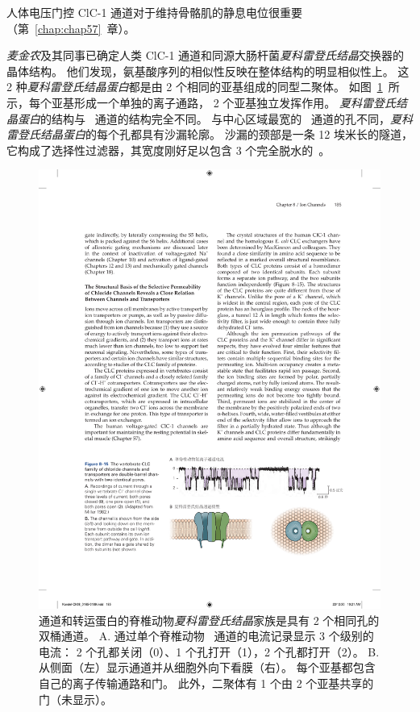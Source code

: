 人体电压门控 ClC-1 通道对于维持骨骼肌的静息电位很重要（第~\ref{chap:chap57}~章）。


\textit{麦金农}及其同事已确定人类 ClC-1 通道和同源大肠杆菌\textit{夏科雷登氏结晶}交换器的晶体结构。
他们发现，氨基酸序列的相似性反映在整体结构的明显相似性上。
这 2 种\textit{夏科雷登氏结晶蛋白}都是由 2 个相同的亚基组成的同型二聚体。
如图~\ref{fig:8_15}~所示，每个亚基形成一个单独的离子通路， 2 个亚基独立发挥作用。
\textit{夏科雷登氏结晶蛋白}的结构与~ 通道的结构完全不同。
与中心区域最宽的~ 通道的孔不同，\textit{夏科雷登氏结晶蛋白}的每个孔都具有沙漏轮廓。
沙漏的颈部是一条 12 埃米长的隧道，它构成了选择性过滤器，其宽度刚好足以包含 3 个完全脱水的~。


\begin{figure}[htbp]
	\centering
	\includegraphics[width=0.8\linewidth]{chap08/fig_8_15}
	\caption{ 通道和转运蛋白的脊椎动物\textit{夏科雷登氏结晶}家族是具有 2 个相同孔的双桶通道。
		A. 通过单个脊椎动物~ 通道的电流记录显示 3 个级别的电流：
		2 个孔都关闭（0）、1 个孔打开（1），2 个孔都打开（2）。
		B. 从侧面（左）显示通道并从细胞外向下看膜（右）。
		每个亚基都包含自己的离子传输通路和门。
		此外，二聚体有 1 个由 2 个亚基共享的门（未显示）。}
	\label{fig:8_15}
\end{figure}


